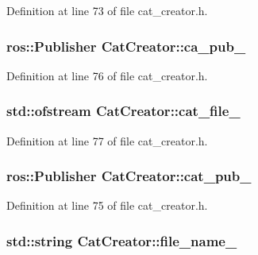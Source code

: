 \-Definition at line 73 of file cat\-\_\-creator.\-h.

\subsubsection[{ca\-\_\-pub\-\_\-}]{\setlength{\rightskip}{0pt plus 5cm}ros\-::\-Publisher {\bf \-Cat\-Creator\-::ca\-\_\-pub\-\_\-}\hspace{0.3cm}{\ttfamily  [private]}}\label{classCatCreator_a484c57f529b81949db33a04954626b93}


\-Definition at line 76 of file cat\-\_\-creator.\-h.

\subsubsection[{cat\-\_\-file\-\_\-}]{\setlength{\rightskip}{0pt plus 5cm}std\-::ofstream {\bf \-Cat\-Creator\-::cat\-\_\-file\-\_\-}\hspace{0.3cm}{\ttfamily  [private]}}\label{classCatCreator_a23010557ce5edaa3137c12c02f094419}


\-Definition at line 77 of file cat\-\_\-creator.\-h.

\subsubsection[{cat\-\_\-pub\-\_\-}]{\setlength{\rightskip}{0pt plus 5cm}ros\-::\-Publisher {\bf \-Cat\-Creator\-::cat\-\_\-pub\-\_\-}\hspace{0.3cm}{\ttfamily  [private]}}\label{classCatCreator_a1ea753ec5f97931cd08273cb40f3d525}


\-Definition at line 75 of file cat\-\_\-creator.\-h.

\subsubsection[{file\-\_\-name\-\_\-}]{\setlength{\rightskip}{0pt plus 5cm}std\-::string {\bf \-Cat\-Creator\-::file\-\_\-name\-\_\-}\hspace{0.3cm}{\ttfamily  [private]}}\label{classCatCreator_a72e673e64b719b99ffc5a5f3adf5f4dc}


